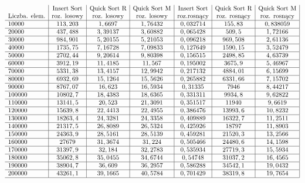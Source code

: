 \documentclass[polish,polish,a4paper]{article}
\begin{document}
\begin{spacing}{1.5}
\begin{figure}[H]
\begin{equation*}
\begin{array}{l|c|c|c|c|c|c|}
	&$Insert Sort$&$Quick Sort R$&$Quick Sort M$&$Insert Sort$&$Quick Sort R$&$Quick Sort M$\\
	$Liczba. elem.$&$roz. losowy$&$roz. losowy$&$roz. losowy$&$roz.rosnący$&$roz. rosnący$&$roz. rosnący$\\\hline
	10000&	113,203&	1,6697&	1,76432&	0,032714&	155,83&	0,838059\\\hline
	20000&	437,488&	3,39137&	3,60882&	0,065428&	509,5&	1,72166\\\hline
	30000&	984,901&	5,20155&	5,21053&	0,096218&	969,508&	2,61136\\\hline
	40000&	1735,75&	7,16728&	7,09833&	0,127649&	1590,15&	3,52479\\\hline
	50000&	2702,44&	9,20614&	9,80398&	0,156515&	2498,85&	4,63739\\\hline
	60000&	3912,19&	11,4185&	11,567&	0,195002&	3675,9&	5,46967\\\hline
	70000&	5331,38&	13,4157&	12,9942&	0,217132&	4884,01&	6,15699\\\hline
	80000&	6932,69&	15,1264&	15,5626&	0,265882&	6331,66&	7,15702\\\hline
	90000&	8767,07&	16,623&	16,5934&	0,31335&	7946&	8,44217\\\hline
	100000&	10802,7&	18,4383&	18,6365&	0,331311&	9934,8&	9,62822\\\hline
	110000&	13141,5&	20,523&	21,3091&	0,351517&	11940&	9,6619\\\hline
	120000&	15639,8&	22,4413&	22,4955&	0,386476&	13993,6&	10,8232\\\hline
	130000&	18263,4&	24,3281&	24,3358&	0,409889&	16322,7&	11,2511\\\hline
	140000&	21317,5&	26,8089&	26,5324&	0,425926&	18797&	11,8903\\\hline
	150000&	24363,9&	28,5161&	28,5139&	0,459281&	21520,3&	13,2566\\\hline
	160000&	27679&	31,3674&	31,224&	0,505466&	24480,6&	14,1598\\\hline
	170000&	31397,9&	32,184&	32,2783&	0,535934&	27719,3&	15,5934\\\hline
	180000&	35062,8&	35,0455&	34,6744&	0,54748&	31037,2&	16,4565\\\hline
	190000&	38904,7&	36,609&	36,2957&	0,586288&	34542,1&	19,0432\\\hline
	200000&	43261,1&	39,1665&	40,5784&	0,701429&	38319,8&	19,7654\\
	
	\hline
	\end{array}
	\end{equation*}
\end{figure}


\end{spacing}
\end{document}
